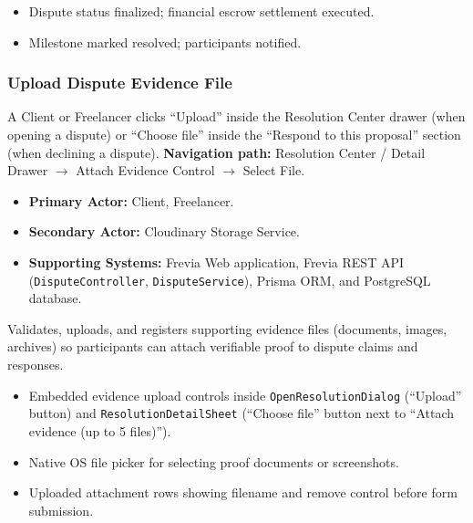 \begin{itemize}[leftmargin=1.6em,topsep=3pt,itemsep=2pt,parsep=0pt,label=$\bullet$]
      \item Dispute status finalized; financial escrow settlement executed.
      \item Milestone marked resolved; participants notified.
\end{itemize}

\subsubsection{ Upload Dispute Evidence File}

A Client or Freelancer clicks ``Upload'' inside the Resolution Center drawer (when opening a dispute) or ``Choose file'' inside the ``Respond to this proposal'' section (when declining a dispute).\newline
\textbf{Navigation path:} Resolution Center / Detail Drawer $\rightarrow$ Attach Evidence Control $\rightarrow$ Select File.


\begin{itemize}[leftmargin=1.6em,topsep=3pt,itemsep=2pt,parsep=0pt,label=$\bullet$]
      \item \textbf{Primary Actor:} Client, Freelancer.
      \item \textbf{Secondary Actor:} Cloudinary Storage Service.
      \item \textbf{Supporting Systems:} Frevia Web application, Frevia REST API (\texttt{DisputeController}, \texttt{DisputeService}), Prisma ORM, and PostgreSQL database.
\end{itemize}

\noindent Validates, uploads, and registers supporting evidence files (documents, images, archives) so participants can attach verifiable proof to dispute claims and responses.

\begin{itemize}[leftmargin=1.6em,topsep=3pt,itemsep=2pt,parsep=0pt,label=$\bullet$]
      \item Embedded evidence upload controls inside \texttt{OpenResolutionDialog} (``Upload'' button) and \texttt{ResolutionDetailSheet} (``Choose file'' button next to ``Attach evidence (up to 5 files)'').
      \item Native OS file picker for selecting proof documents or screenshots.
      \item Uploaded attachment rows showing filename and remove control before form submission.
\end{itemize}


